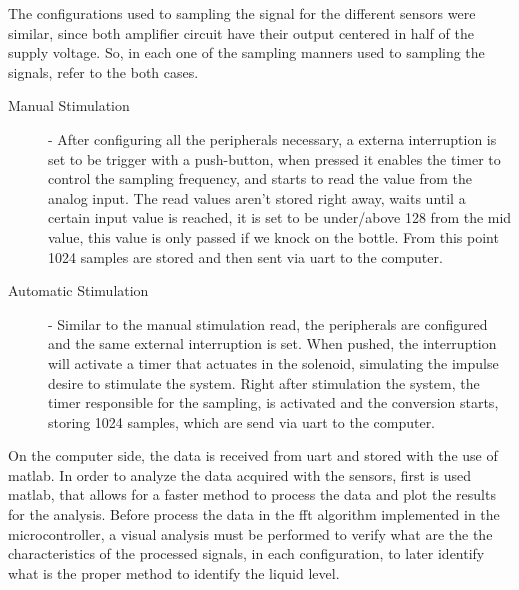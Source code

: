 The configurations used to sampling the signal for the different sensors were similar, since both amplifier circuit have their output centered in half of the supply voltage. So, in each one of the sampling manners used to sampling the signals, refer to the both cases. 

 
\begin{description}
    \item[Manual Stimulation]{- After configuring all the peripherals necessary, a externa interruption is set to be trigger with a push-button, when pressed it enables the timer to control the sampling frequency, and starts to read the value from the analog input. The read values aren't stored right away, waits until a certain input value is reached, it is set to be under/above 128 from the mid value, this value is only passed if we knock on the bottle. From this point 1024 samples are stored and then sent via \acrshort{uart} to the computer.}
      
    \item[Automatic Stimulation]{- Similar to the manual stimulation read, the peripherals are configured and the same external interruption is set. When pushed, the interruption will activate a timer that actuates in the solenoid, simulating the impulse desire to stimulate the system. Right after stimulation the system, the timer responsible for the sampling, is activated and the conversion starts, storing 1024 samples, which are send via \acrshort{uart} to the computer.} 

\end{description}
On the computer side, the data is received from \acrshort{uart} and stored with the use of \acrshort{matlab}. In order to analyze the data acquired with the sensors, first is used \acrshort{matlab}, that allows for a faster method to process the data and plot the results for the analysis. Before process the data in the \acrshort{fft} algorithm implemented in the microcontroller, a visual analysis must be performed to verify what are the the characteristics of the processed signals, in each configuration, to later identify what is the proper method to identify the liquid level.  
